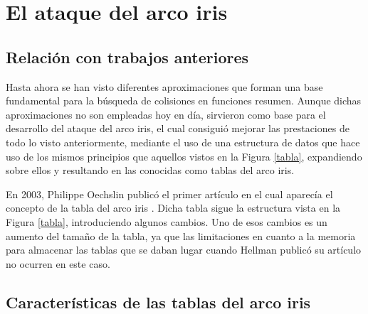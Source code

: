 \documentclass[12pt,spanish,listoffigures,listoftables,listofalgorithms]{tfgetsinf}
\newcommand{\hashes}{\textit{hashes}}
\begin{document}

\chapter{El ataque del arco iris} \label{ataque}

\section{Relación con trabajos anteriores}

Hasta ahora se han visto diferentes aproximaciones que forman una base fundamental para la búsqueda de colisiones en funciones resumen. Aunque dichas aproximaciones no son empleadas hoy en día, sirvieron como base para el desarrollo del ataque del arco iris, el cual consiguió mejorar las prestaciones de todo lo visto anteriormente, mediante el uso de una estructura de datos que hace uso de los mismos principios que aquellos vistos en la Figura \ref{tabla}, expandiendo sobre ellos y resultando en las conocidas como tablas del arco iris.

En 2003, Philippe Oechslin publicó el primer artículo en el cual aparecía el concepto de la tabla del arco iris \cite{rainbow}. Dicha tabla sigue la estructura vista en la Figura \ref{tabla}, introduciendo algunos cambios. Uno de esos cambios es un aumento del tamaño de la tabla, ya que las limitaciones en cuanto a la memoria para almacenar las tablas que se daban lugar cuando Hellman publicó su artículo no ocurren en este caso.

\section{Características de las tablas del arco iris}
\end{document}
